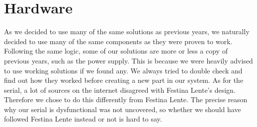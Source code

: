 \section {Hardware}

As we decided to use many of the same solutions as previous years, we naturally
decided to use many of the same components as they were proven to
work. Following the same logic, some of our solutions are more or less a copy of
previous years, such as the power supply. This is because we were heavily
advised to use working solutions if we found any. We always
tried to double check and find out how they worked before creating a new part in
our system. As for the serial, a lot of sources on the internet disagreed with
Festina Lente's design. Therefore we chose to do this differently from Festina Lente.
The precise reason why our serial is dysfunctional was not uncovered, so whether we
should have followed Festina Lente instead or not is hard to say.
